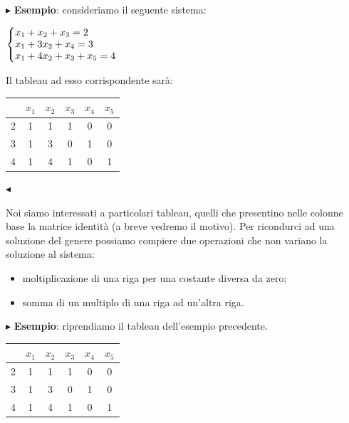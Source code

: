 \documentclass[11pt]{book}
\makeatletter
\newenvironment{sistema}%
{\left\lbrace\begin{array}{@{}l@{}}}%
{\end{array}\right.}
\makeatother
\begin{document}
\vspace{11pt}
$\blacktriangleright$ {\bf Esempio}: consideriamo il seguente sistema:

\begin{center}

  $\begin{sistema}
  x_1 + x_2 + x_3 = 2 \\
  x_1 + 3x_2 + x_4 = 3 \\
  x_1 + 4x_2 + x_3 + x_5 = 4
  \end{sistema}$

\end{center}

Il tableau ad esso corrispondente sar\`a:

\begin{center}
  
  \begin{tabular}{c|ccccc}
    & $x_1$ & $x_2$ & $x_3$ & $x_4$ & $x_5$ \\\hline
    2 & 1 & 1 & 1 & 0 & 0 \\
    3 & 1 & 3& 0 & 1& 0 \\
    4 & 1 & 4 & 1 & 0 & 1 \\
  \end{tabular}

\end{center}
$\blacktriangleleft$
\linebreak\vspace{11pt}

Noi siamo interessati a particolari tableau, quelli che presentino
nelle colonne base la matrice identit\`a (a breve vedremo il
motivo). Per ricondurci ad una soluzione del genere possiamo compiere
due operazioni che non variano la soluzione al sistema:

\begin{itemize}
\item moltiplicazione di una riga per una costante diversa da zero;
\item somma di un multiplo di una riga ad un'altra riga.
\end{itemize}

\vspace{11pt}
$\blacktriangleright$ {\bf Esempio}: riprendiamo il tableau
dell'esempio precedente.

\begin{center}

  \begin{tabular}{c|ccccc}
    & $x_1$ & $x_2$ & $x_3$ & $x_4$ & $x_5$ \\\hline
    2 & 1 & 1 & 1 & 0 & 0 \\
    3 & 1 & 3& 0 & 1& 0 \\
    4 & 1 & 4 & 1 & 0 & 1 \\
  \end{tabular}

\end{center}
\end{document}
